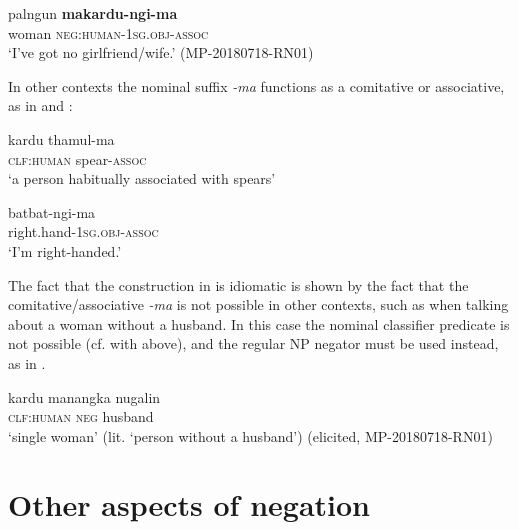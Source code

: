\documentclass[output=paper,colorlinks,citecolor=brown]{langscibook}
\begin{document}
\ea\label{ex:mur:113} 
    \gll  palngun \textbf{makardu-ngi-ma}\\
         woman \textsc{neg:human-1sg.obj-assoc}\\
    \glt ‘I’ve got no girlfriend/wife.’ (MP-20180718-RN01)
\z

\z 

In other contexts the nominal suffix \textit{{}-ma} functions as a comitative \citep[183]{Walsh1976} or associative, as in  and :

\ea\label{ex:mur:115} 
    \gll  kardu thamul-ma\\
         \textsc{clf:human} spear-\textsc{assoc}\\
    \glt ‘a person habitually associated with spears’ \citep[187]{Walsh1976} 
\z 

\ea\label{ex:mur:116}
    \gll batbat-ngi-ma\\
         right.hand-\textsc{1sg.obj-assoc}\\
    \glt ‘I’m right-handed.’ \citep[166]{Mansfield2019}
\z 

The fact that the construction in  is idiomatic is shown by the fact that the comitative/associative \textit{{}-ma} is not possible in other contexts, such as when talking about a woman without a husband. In this case the nominal classifier predicate is not possible (cf.  with  above), and the regular NP negator must be used instead, as in .

\ea\label{ex:mur:117} 
    \gll kardu manangka nugalin\\
         \textsc{clf:human} \textsc{neg} husband\\
    \glt ‘single woman’ (lit. ‘person without a husband’) (elicited, MP-20180718-RN01) 
\z 

\z 

\section{Other aspects of negation} \label{sec:mur:4}
\end{document}
